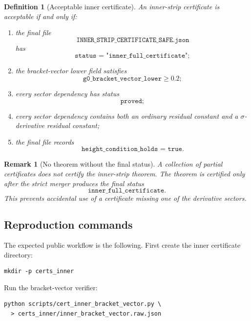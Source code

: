 \documentclass[11pt]{article}
\newtheorem{definition}[theorem]{Definition}
\newtheorem{remark}[theorem]{Remark}
\begin{document}
\begin{definition}[Acceptable inner certificate]
\label{def:acceptable-inner-certificate}
An inner-strip certificate is acceptable if and only if:

\begin{enumerate}[label=(\roman*)]
    \item the final file
    \[
            \texttt{INNER\_STRIP\_CERTIFICATE\_SAFE.json}
    \]
    has
    \[
            \texttt{status = "inner\_full\_certificate"};
    \]

    \item the bracket-vector lower field satisfies
    \[
            \texttt{g0\_bracket\_vector\_lower}\ge0.2;
    \]

    \item every sector dependency has status
    \[
            \texttt{proved};
    \]

    \item every sector dependency contains both an ordinary residual constant
    and a \(\sigma\)-derivative residual constant;

    \item the final file records
    \[
            \texttt{height\_condition\_holds = true}.
    \]
\end{enumerate}
\end{definition}

\begin{remark}[No theorem without the final status]
A collection of partial certificates does not certify the inner-strip theorem.
The theorem is certified only after the strict merger produces the final status
\[
        \texttt{inner\_full\_certificate}.
\]
This prevents accidental use of a certificate missing one of the derivative
sectors.
\end{remark}

\subsection{Reproduction commands}

The expected public workflow is the following.  First create the inner
certificate directory:
\begin{verbatim}
mkdir -p certs_inner
\end{verbatim}

Run the bracket-vector verifier:
\begin{verbatim}
python scripts/cert_inner_bracket_vector.py \
  > certs_inner/inner_bracket_vector.raw.json
\end{verbatim}
\end{document}
